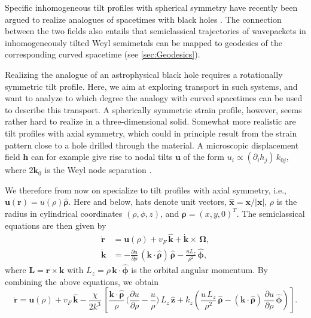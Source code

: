\documentclass[submission, Phys]{SciPost}
\begin{document}
Specific inhomogeneous tilt profiles with spherical symmetry have recently been argued to realize analogues of spacetimes with black holes \cite{Volovik2016,Volovik2017,Guan_2017,Weststrom_2017,Huang2018,Zubkov_2018,Liang2019,Kedem2020,Hashimoto2020,De_Beule_2021, Morice21,Sabsovich_2022}. The connection between the two fields also entails that semiclassical trajectories of wavepackets in inhomogeneously tilted Weyl semimetals can be mapped to geodesics of the corresponding curved spacetime (see \cref{sec:Geodesics}).

Realizing the analogue of an astrophysical black hole requires a rotationally symmetric tilt profile.  Here, we aim at exploring transport in such systems, and want to analyze to which degree the analogy with curved spacetimes can be used to describe this transport. A spherically symmetric strain profile, however, seems rather hard to realize in a three-dimensional solid. Somewhat more realistic are tilt profiles with axial symmetry, which could in principle result from the strain pattern close to a hole drilled through the material. A microscopic displacement field $\bm h$ can for example give rise to nodal tilts $\bm u$ of the form $u_i\propto (\partial_i h_j)\,k_{0j}$, where $2\bm k_0$ is the Weyl node separation \cite{Arjona18}. 

We therefore from now on specialize to tilt profiles with axial symmetry, i.e., $\bm{u}(\bm{r})=u(\rho)\hat{\bm \rho}$. Here and below, hats denote unit vectors, $\hat{\bm x} = \bm{x}/|\bm{x}|$, $\rho$ is the radius in cylindrical coordinates $(\rho,\phi,z)$, and $\bm{\rho} = (x,y,0)^T$. The semiclassical equations are then given by 
\begin{align}
    \dot{\bm{r}}&=\bm{u}(\rho) + v_F \,\hat{\bm k} +\dot{\bm{k}}\times \,\bm{\Omega}, \label{Eq:sem_r_dot}\\
    \dot{\bm{k}}&=-\frac{\partial u}{\partial \rho}\,(\bm{k}\cdot\hat{\bm \rho})\,\hat{\bm \rho}-\frac{uL_z}{\rho^2}\,\hat{\bm \phi},
    \label{Eq:sem_k_dot}
\end{align}
where $\bm{L}=\bm{r}\times\bm{k}$ with $L_z = \rho \, \bm k \cdot \hat{\bm \phi}$ is the orbital angular momentum. By combining the above equations, we obtain
\begin{equation}
    \dot{\bm{r}}=\bm{u}(\rho) +v_F \,\hat{\bm k}-\frac{\chi}{2k^3}\,\left[ \frac{\bm k \cdot \hat{\bm \rho}}{\rho}\, \bigg( \frac{\partial u}{\partial \rho}-\frac{u}{\rho}\bigg)\,L_z \,\hat{\bm z} + k_z \left( \frac{u \,L_z}{\rho^2} \, \hat{\bm \rho} - (\bm k \cdot \hat{\bm \rho})\, \frac{\partial u}{\partial \rho}\, \hat{\bm \phi} \right) \right].
    \label{eq:spatial_eom}
\end{equation}
\end{document}
